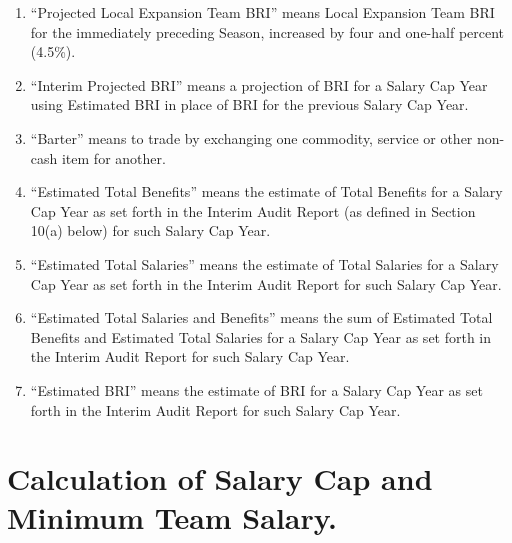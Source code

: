 \documentclass[
]{book}
\begin{document}
\begin{enumerate}
\item
  ``Projected Local Expansion Team BRI'' means Local Expansion Team BRI for the immediately preceding Season, increased by four and one-half percent (4.5\%).
\item
  ``Interim Projected BRI'' means a projection of BRI for a Salary Cap Year using Estimated BRI in place of BRI for the previous Salary Cap Year.
\item
  ``Barter'' means to trade by exchanging one commodity, service or other non-cash item for another.
\item
  ``Estimated Total Benefits'' means the estimate of Total Benefits for a Salary Cap Year as set forth in the Interim Audit Report (as defined in Section 10(a) below) for such Salary Cap Year.
\item
  ``Estimated Total Salaries'' means the estimate of Total Salaries for a Salary Cap Year as set forth in the Interim Audit Report for such Salary Cap Year.
\item
  ``Estimated Total Salaries and Benefits'' means the sum of Estimated Total Benefits and Estimated Total Salaries for a Salary Cap Year as set forth in the Interim Audit Report for such Salary Cap Year.
\item
  ``Estimated BRI'' means the estimate of BRI for a Salary Cap Year as set forth in the Interim Audit Report for such Salary Cap Year.
\end{enumerate}

\hypertarget{calculation-of-salary-cap-and-minimum-team-salary.}{%
\section{Calculation of Salary Cap and Minimum Team Salary.}\label{calculation-of-salary-cap-and-minimum-team-salary.}}
\end{document}
